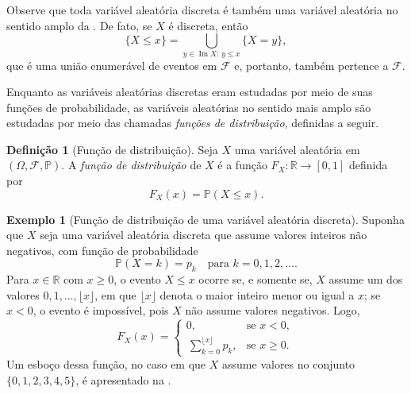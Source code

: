 \documentclass[12pt,portuguese]{article}
\theoremstyle{definition}
\newtheorem{definition}[definition]{Definição}
\newtheorem{example}[example]{Exemplo}
\theoremstyle{plainexercise}
\theoremstyle{starredexercise}
\theoremstyle{definition}
\begin{document}
Observe que toda variável aleatória discreta é também uma variável aleatória
no sentido amplo da . De
fato, se $X$ é discreta, então
\[
  \{X\leqslant x\}
  = \bigcup_{y\in\operatorname{Im}X :\, y\leqslant x} \{X=y\},
\]
que é uma união enumerável de eventos em $\mathcal{F}$ e, portanto, também
pertence a $\mathcal{F}$.

Enquanto as variáveis aleatórias discretas eram estudadas por meio de suas
funções de probabilidade, as variáveis aleatórias no sentido mais amplo são
estudadas por meio das chamadas \emph{funções de distribuição}, definidas a seguir.

\begin{definition}[Função de distribuição]
\label{def:funcao-distribuicao}
Seja $X$ uma variável aleatória em $(\Omega,\mathcal{F},\mathbb{P})$. A
\emph{função de distribuição} de $X$ é a função
$F_X:\mathbb{R}\to[0,1]$ definida por
\begin{equation}
\label{eq:def-funcao-distribuicao}
  F_X(x)=\mathbb{P}(X\leqslant x).
\end{equation}
\end{definition}

\begin{example}[Função de distribuição de uma variável aleatória discreta]
\label{ex:fd-discreta}
Suponha que $X$ seja uma variável aleatória discreta que assume valores
inteiros não negativos, com função de probabilidade
\[
  \mathbb{P}(X=k)=p_k \quad\text{para } k=0,1,2,\dots.
\]
Para $x\in\mathbb{R}$ com $x\geqslant 0$, o evento $X\leqslant x$ ocorre se, e
somente se, $X$ assume um dos valores $0,1,\dots,\lfloor x\rfloor$, em que
  $\lfloor x\rfloor$ denota o maior inteiro menor ou igual a $x$; se $x<0$, o
evento é impossível, pois $X$ não assume valores negativos. Logo,
\[
  F_X(x)=
  \begin{cases}
    0, & \text{se } x<0,\\[0.4cm]
    \, \displaystyle\sum_{k=0}^{\lfloor x\rfloor} p_k, & \text{se } x\geqslant 0.
  \end{cases}
\]
Um esboço dessa função, no caso em que $X$ assume valores no conjunto
$\{0,1,2,3,4,5\}$, é apresentado na .
\end{example}
\end{document}
